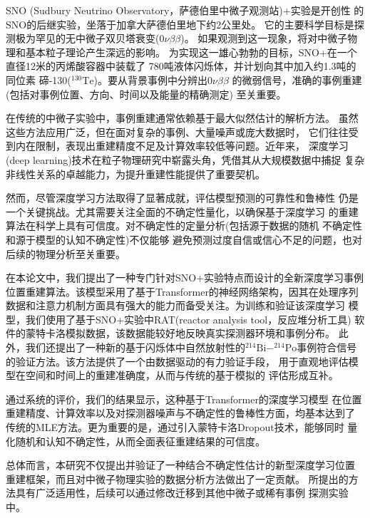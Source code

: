 \begin{cnabstract}

SNO (Sudbury Neutrino Observatory，萨德伯里中微子观测站)+实验是开创性
的SNO的后继实验，坐落于加拿大萨德伯里地下约2公里处。
它的主要科学目标是探测极为罕见的无中微子双贝塔衰变(0$\nu\beta\beta$)。
如果观测到这一现象，将对中微子物理和基本粒子理论产生深远的影响。
为实现这一雄心勃勃的目标，SNO+在一个直径12米的丙烯酸容器中装载了
780吨液体闪烁体，并计划向其中加入约1.3吨的同位素
碲-130($^{130}\mathrm{Te}$)。要从背景事例中分辨出0$\nu\beta\beta$
的微弱信号，准确的事例重建(包括对事例位置、方向、时间以及能量的精确测定)
至关重要。

在传统的中微子实验中，事例重建通常依赖基于最大似然估计的解析方法。
虽然这些方法应用广泛，但在面对复杂的事例、大量噪声或庞大数据时，
它们往往受到内在限制，表现出重建精度不足及计算效率较低等问题。近年来，
深度学习(deep learning)技术在粒子物理研究中崭露头角，凭借其从大规模数据中捕捉
复杂非线性关系的卓越能力，为提升重建性能提供了重要契机。

然而，尽管深度学习方法取得了显著成就，评估模型预测的可靠性和鲁棒性
仍是一个关键挑战。尤其需要关注全面的不确定性量化，以确保基于深度学习
的重建算法在科学上具有可信度。对不确定性的定量分析(包括源于数据的随机
不确定性和源于模型的认知不确定性)不仅能够
避免预测过度自信或信心不足的问题，也对后续的物理分析至关重要。

在本论文中，我们提出了一种专门针对SNO+实验特点而设计的全新深度学习事例
位置重建算法。该模型采用了基于Transformer的神经网络架构，因其在处理序列
数据和注意力机制方面具有强大的能力而备受关注。为训练和验证该深度学习
模型，我们使用了基于SNO+实验中RAT(reactor analysis tool，反应堆分析工具)
软件的蒙特卡洛模拟数据，该数据能较好地反映真实探测器环境和事例分布。
此外，我们还提出了一种新的基于闪烁体中自然放射性的$^{214}\mathrm{Bi}-^{214}\mathrm{Po}$事例符合信号
的验证方法。该方法提供了一个由数据驱动的有力验证手段，
用于直观地评估模型在空间和时间上的重建准确度，从而与传统的基于模拟的
评估形成互补。

通过系统的评价，我们的结果显示，这种基于Transformer的深度学习模型
在位置重建精度、计算效率以及对探测器噪声与不确定性的鲁棒性方面，均基本达到了
传统的MLE方法。更为重要的是，通过引入蒙特卡洛Dropout技术，能够同时
量化随机和认知不确定性，从而全面表征重建结果的可信度。

总体而言，本研究不仅提出并验证了一种结合不确定性估计的新型深度学习位置
重建框架，而且对中微子物理实验的数据分析方法做出了一定贡献。
所提出的方法具有广泛适用性，后续可以通过修改迁移到其他中微子或稀有事例
探测实验中。


\end{cnabstract}

